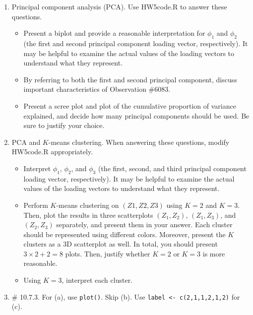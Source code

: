 \documentclass[12pt]{article}
\begin{document}
\begin{enumerate}
\item Principal component analysis (PCA). Use HW5code.R to answer these questions.
\begin{itemize}
\item[(a)] Present a biplot and provide a reasonable interpretation for $\phi_1$ and $\phi_2$ (the first and second principal component loading vector, respectively). It may be helpful to examine the actual values of the loading vectors to understand what they represent.
\item[(b)] By referring to both the first and second principal component, discuss important characteristics of Observation \#6083.
\item[(c)] Present a scree plot and plot of the cumulative proportion of variance explained, and decide how many principal components should be used. Be sure to justify your choice.
\end{itemize}

\item PCA and $K$-means clustering. When answering these questions, modify HW5code.R appropriately.
\begin{itemize}
\item[(a)] Interpret $\phi_1$, $\phi_2$, and $\phi_3$ (the first, second, and third principal component loading vector, respectively). It may be helpful to examine the actual values of the loading vectors to understand what they represent.
\item[(b)] Perform $K$-means clustering on $(Z1, Z2, Z3)$ using $K = 2$ and $K = 3$. Then, plot the results in three scatterplots $(Z_1, Z_2)$, $(Z_1, Z_3)$, and $(Z_2, Z_3)$ separately, and present them in your answer. Each cluster should be represented using different colors. Moreover, present the $K$ clusters as a 3D scatterplot as well. In total, you should present $3 \times 2 + 2= 8$ plots. Then, justify whether $K = 2$ or $K = 3$ is more reasonable.
\item[(c)] Using $K = 3$, interpret each cluster.
\end{itemize}

\item \# 10.7.3. For (a), use {\tt plot()}. Skip (b). Use {\tt label <- c(2,1,1,2,1,2)} for (c). \\

\end{enumerate}
\end{document}
